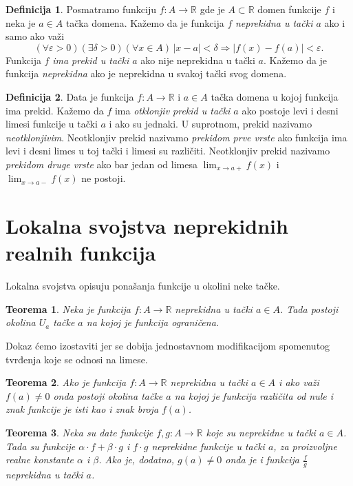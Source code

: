 \documentclass[a4paper,12pt]{article}
\theoremstyle{plain}
\newtheorem{theorem}{Teorema}[section]
\theoremstyle{definition}
\newtheorem{definition}{Definicija}[section]
\theoremstyle{remark}
\begin{document}
\begin{definition}
Posmatramo funkciju $f : A \rightarrow \mathbb{R}$ gde je $A \subset \mathbb{R}$ domen funkcije $f$ i neka je $a \in A$ tačka domena. Kažemo da je funkcija $f$ \textit{neprekidna u tački $a$} ako i samo ako važi
\begin{equation}
(\forall \varepsilon > 0)(\exists \delta > 0)(\forall x \in A) \, |x - a| < \delta \Rightarrow |f(x) - f(a)| < \varepsilon.
\end{equation}
Funkcija $f$ \textit{ima prekid u tački $a$} ako nije neprekidna u tački $a$. Kažemo da je funkcija \textit{neprekidna} ako je neprekidna u svakoj tački svog domena.
\end{definition}
\begin{definition}
Data je funkcija $f : A \rightarrow \mathbb{R}$ i $a \in A$ tačka domena u kojoj funkcija ima prekid. Kažemo da $f$ ima \textit{otklonjiv prekid u tački $a$} ako postoje levi i desni limesi funkcije u tački $a$ i ako su jednaki. U suprotnom, prekid nazivamo \textit{neotklonjivim}. Neotklonjiv prekid nazivamo \textit{prekidom prve vrste} ako funkcija ima levi i desni limes u toj tački i limesi su različiti. Neotklonjiv prekid nazivamo \textit{prekidom druge vrste} ako bar jedan od limesa $\lim_{x \to a+} f(x)$ i $\lim_{x \to a-} f(x)$ ne postoji.
\end{definition}

\section{Lokalna svojstva neprekidnih realnih funkcija}
Lokalna svojstva opisuju ponašanja funkcije u okolini neke tačke.
\begin{theorem}
Neka je funkcija $f : A \rightarrow \mathbb{R}$ neprekidna u tački $a \in A$. Tada postoji okolina $U_a$ tačke $a$ na kojoj je funkcija ograničena.
\end{theorem}
\noindent Dokaz ćemo izostaviti jer se dobija jednostavnom modifikacijom spomenutog tvrđenja koje se odnosi na limese.

\begin{theorem}
Ako je funkcija $f : A \rightarrow \mathbb{R}$ neprekidna u tački $a \in A$ i ako važi $f(a) \neq 0$ onda postoji okolina tačke $a$ na kojoj je funkcija različita od nule i znak funkcije je isti kao i znak broja $f(a)$.
\end{theorem}

\begin{theorem}
Neka su date funkcije $f,g : A \rightarrow \mathbb{R}$ koje su neprekidne u tački $a \in A$. Tada su funkcije $\alpha \cdot f + \beta \cdot g$ i $f \cdot g$ neprekidne funkcije u tački $a$, za proizvoljne realne konstante $\alpha$ i $\beta$. Ako je, dodatno, $g(a) \neq 0$ onda je i funkcija $\frac{f}{g}$ neprekidna u tački $a$.
\end{theorem}
\end{document}
